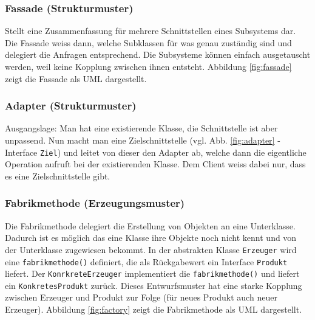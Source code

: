 
\newpage

\subsubsection{Fassade (Strukturmuster)}
Stellt eine Zusammenfassung für mehrere Schnittstellen eines Subsystems dar. Die Fassade weiss dann, welche Subklassen für was genau zuständig sind und delegiert die Anfragen entsprechend. Die Subsysteme können einfach ausgetauscht werden, weil keine Kopplung zwischen ihnen entsteht. Abbildung \ref{fig:fassade} zeigt die Fassade als UML dargestellt.


\subsubsection{Adapter (Strukturmuster)}
Ausgangslage: Man hat eine existierende Klasse, die Schnittstelle ist aber unpassend. Nun macht man eine Zielschnittstelle (vgl. Abb. \ref{fig:adapter} - Interface \texttt{Ziel}) und leitet von dieser den Adapter ab, welche dann die eigentliche Operation aufruft bei der existierenden Klasse. Dem Client weiss dabei nur, dass es eine Zielschnittstelle gibt.


\newpage

\subsubsection{Fabrikmethode (Erzeugungsmuster)}
Die Fabrikmethode delegiert die Erstellung von Objekten an eine Unterklasse. Dadurch ist es möglich das eine Klasse ihre Objekte noch nicht kennt und von der Unterklasse zugewiesen bekommt. In der abstrakten Klasse \texttt{Erzeuger} wird eine \texttt{fabrikmethode()} definiert, die als Rückgabewert ein Interface \texttt{Produkt} liefert. Der \texttt{KonrkreteErzeuger} implementiert die \texttt{fabrikmethode()} und liefert ein \texttt{KonkretesProdukt} zurück. Dieses Entwurfsmuster hat eine starke Kopplung zwischen Erzeuger und Produkt zur Folge (für neues Produkt auch neuer Erzeuger). Abbildung \ref{fig:factory} zeigt die Fabrikmethode als UML dargestellt.


